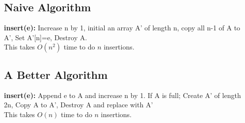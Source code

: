 \documentclass[5pt,a4paper]{article}
\begin{document}
\begin{multicols}{3}
    \subsection{Naive Algorithm}
    \textbf{insert(e):} Increase n by 1, initial an array A' of length n, copy all n-1 of A to A', Set A'[n]=e, Destroy A.\\
    This takes $O(n^2)$ time to do $n$ insertions.
    \subsection{A Better Algorithm}
    \textbf{insert(e):} Append e to A and increase n by 1. If A is full; Create A' of length 2n, Copy A to A', Destroy A and replace with A'\\
    This takes $O(n)$ time to do $n$ insertions.

\end{multicols}
\end{document}
